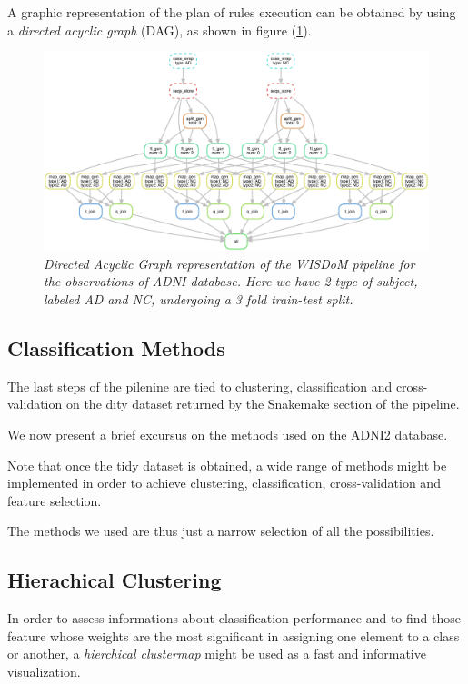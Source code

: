 \documentclass[12pt,openright,twoside,a4paper]{book}
\begin{document}
A graphic representation of the plan of rules execution can be obtained by using a \textit{directed acyclic graph} (DAG), as shown in figure (\ref{dag}).

\begin{figure}[!h]
\centering
\includegraphics[scale=0.53, angle=270]{dag}
\caption{\textit{Directed Acyclic Graph representation of the WISDoM pipeline for the observations of ADNI database. Here we have 2 type of subject, labeled AD and NC, undergoing a 3 fold train-test split.}}
\label{dag}
\end{figure}

\subsection{Classification Methods}

The last steps of the pilenine are tied to clustering, classification and cross-validation on the dity dataset returned by the Snakemake section of the pipeline.

We now present a brief excursus on the methods used on the ADNI2 database.

Note that once the tidy dataset is obtained, a wide range of methods might be implemented in order to achieve clustering, classification, cross-validation and feature selection.

The methods we used are thus just a narrow selection of all the possibilities.

\subsection*{Hierachical Clustering}

In order to assess informations about classification performance and to find those feature whose weights are the most significant in assigning one element to a class or another, a \textit{hierchical clustermap} might be used as a fast and informative visualization.
\end{document}
